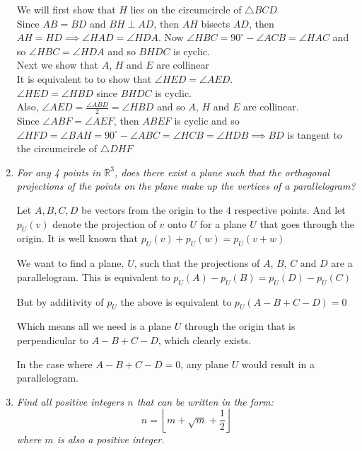\documentclass{article}
\begin{document}
\begin{enumerate}
We will first show that $H$ lies on the circumcircle of $\triangle BCD$ 
\\ Since $AB = BD$ and $BH \perp AD$, then $AH$ bisects $AD$, then $AH = HD \implies \angle HAD = \angle HDA$. Now $\angle HBC = 90^{\circ} - \angle ACB = \angle HAC$ and so $\angle HBC = \angle HDA$ and so $BHDC$ is cyclic. 
\\ Next we show that $A$, $H$ and $E$ are collinear
\\It is equivalent to to show that $\angle HED = \angle AED$. 
\\ $\angle HED = \angle HBD$ since $BHDC$ is cyclic. 
\\ Also, $\angle AED = \frac{\angle ABD}{2} = \angle HBD$ and so $A$, $H$ and $E$ are collinear. 
\\ Since $\angle ABF = \angle AEF$, then $ABEF$ is cyclic and so $\angle HFD = \angle BAH = 90^{\circ} - \angle ABC = \angle HCB = \angle HDB \implies BD$ is tangent to the circumcircle of $ \triangle DHF$



\medskip
\item %
{\itshape For any 4 points in $\mathbb{R}^3$, does there exist a plane such that the orthogonal projections of the points on the plane make up the vertices of a parallelogram?

}
Let $A,B,C,D$ be vectors from the origin to the $4$ respective points.
And let $p_U(v)$ denote the projection of $v$ onto $U$ for a plane $U$ that goes through the origin. It is well known that $p_U(v) + p_U(w) = p_U(v + w)$

We want to find a plane, $U$, such that the projections of $A$, $B$, $C$ and $D$ are a parallelogram. This is equivalent to
$p_U(A) - p_U(B) = p_U(D) - p_U(C)$

But by additivity of $p_U$ the above is equivalent to
$p_U(A - B + C - D) = 0$

Which means all we need is a plane $U$ through the origin that is perpendicular to $A - B + C - D$, which clearly exists.

In the case where $A - B + C - D = 0$, any plane $U$ would result in a parallelogram.

\medskip
\item %
{\itshape Find all positive integers $n$ that can be written in the form:
$$n = \left\lfloor m + \sqrt{m} + \frac{1}{2} \right\rfloor$$
where $m$ is also a positive integer.}


\end{enumerate}
\end{document}

